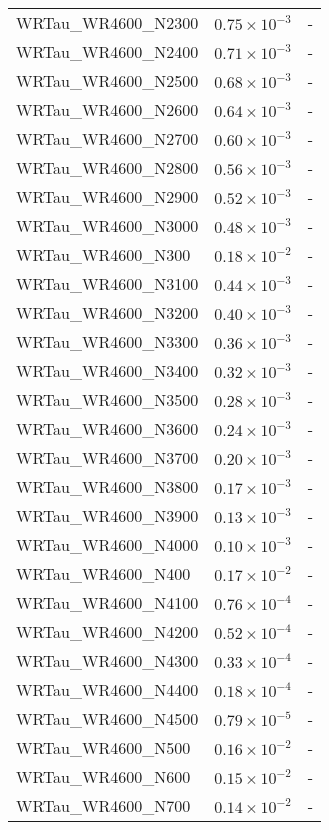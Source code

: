 \begin{longtable}[c]{| C{.35\textwidth} | C{.15\textwidth} | C{.1\textwidth}|}
    WRTau\_WR4600\_N2300 & $0.75\times10^{-3}$ & - \\
    WRTau\_WR4600\_N2400 & $0.71\times10^{-3}$ & - \\
    WRTau\_WR4600\_N2500 & $0.68\times10^{-3}$ & - \\
    WRTau\_WR4600\_N2600 & $0.64\times10^{-3}$ & - \\
    WRTau\_WR4600\_N2700 & $0.60\times10^{-3}$ & - \\
    WRTau\_WR4600\_N2800 & $0.56\times10^{-3}$ & - \\
    WRTau\_WR4600\_N2900 & $0.52\times10^{-3}$ & - \\
    WRTau\_WR4600\_N3000 & $0.48\times10^{-3}$ & - \\
    WRTau\_WR4600\_N300 & $0.18\times10^{-2}$ & - \\
    WRTau\_WR4600\_N3100 & $0.44\times10^{-3}$ & - \\
    WRTau\_WR4600\_N3200 & $0.40\times10^{-3}$ & - \\
    WRTau\_WR4600\_N3300 & $0.36\times10^{-3}$ & - \\
    WRTau\_WR4600\_N3400 & $0.32\times10^{-3}$ & - \\
    WRTau\_WR4600\_N3500 & $0.28\times10^{-3}$ & - \\
    WRTau\_WR4600\_N3600 & $0.24\times10^{-3}$ & - \\
    WRTau\_WR4600\_N3700 & $0.20\times10^{-3}$ & - \\
    WRTau\_WR4600\_N3800 & $0.17\times10^{-3}$ & - \\
    WRTau\_WR4600\_N3900 & $0.13\times10^{-3}$ & - \\
    WRTau\_WR4600\_N4000 & $0.10\times10^{-3}$ & - \\
    WRTau\_WR4600\_N400 & $0.17\times10^{-2}$ & - \\
    WRTau\_WR4600\_N4100 & $0.76\times10^{-4}$ & - \\
    WRTau\_WR4600\_N4200 & $0.52\times10^{-4}$ & - \\
    WRTau\_WR4600\_N4300 & $0.33\times10^{-4}$ & - \\
    WRTau\_WR4600\_N4400 & $0.18\times10^{-4}$ & - \\
    WRTau\_WR4600\_N4500 & $0.79\times10^{-5}$ & - \\
    WRTau\_WR4600\_N500 & $0.16\times10^{-2}$ & - \\
    WRTau\_WR4600\_N600 & $0.15\times10^{-2}$ & - \\
    WRTau\_WR4600\_N700 & $0.14\times10^{-2}$ & - \\

\end{longtable}
